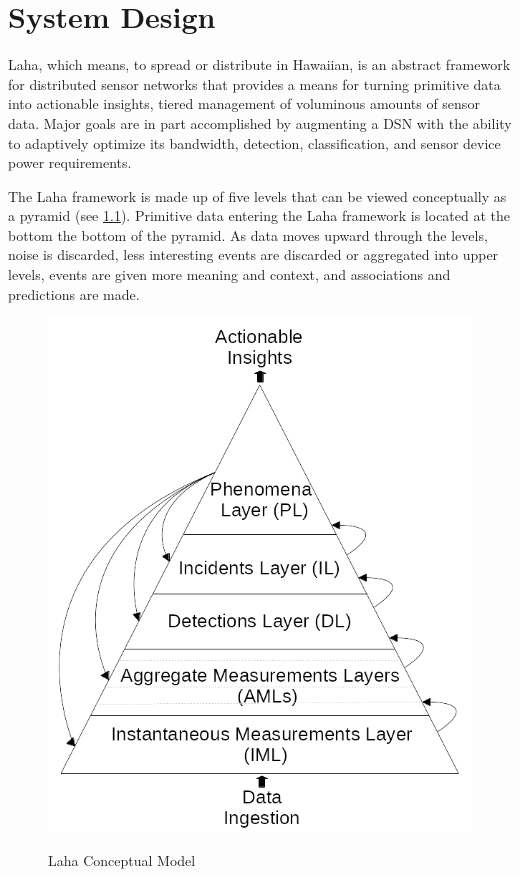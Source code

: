 \chapter{System Design}
Laha, which means, to spread or distribute in Hawaiian, is an abstract framework for distributed sensor networks that provides a means for turning primitive data into actionable insights, tiered management of voluminous amounts of sensor data. Major goals are in part accomplished by augmenting a DSN with the ability to adaptively optimize its bandwidth, detection, classification, and sensor device power requirements.

The Laha framework is made up of five levels that can be viewed conceptually as a pyramid (see \ref{laha-figure}). Primitive data entering the Laha framework is located at the bottom the bottom of the pyramid. As data moves upward through the levels, noise is discarded, less interesting events are discarded or aggregated into upper levels, events are given more meaning and context, and associations and predictions are made. 

\begin{figure}
\caption{Laha Conceptual Model}
\centering
\includegraphics{figures/laha.png}	
\label{laha-figure}
\end{figure}

